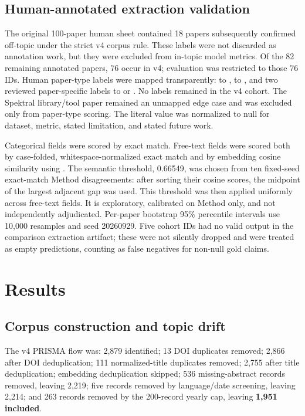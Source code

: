 \documentclass[sigconf,review,anonymous]{acmart}
\begin{document}
\subsection{Human-annotated extraction validation}
The original 100-paper human sheet contained 18 papers subsequently confirmed off-topic under the strict v4 corpus rule. These labels were not discarded as annotation work, but they were excluded from in-topic model metrics. Of the 82 remaining annotated papers, 76 occur in v4; evaluation was restricted to those 76 IDs. Human paper-type labels were mapped transparently: \texttt{} to \texttt{}, \texttt{} to \texttt{}, and two reviewed paper-specific labels to \texttt{} or \texttt{}. No \texttt{} labels remained in the v4 cohort. The Spektral library/tool paper remained an unmapped edge case and was excluded only from paper-type scoring. The literal value \texttt{} was normalized to null for dataset, metric, stated limitation, and stated future work.

Categorical fields were scored by exact match. Free-text fields were scored both by case-folded, whitespace-normalized exact match and by embedding cosine similarity using \texttt{}. The semantic threshold, 0.66549, was chosen from ten fixed-seed exact-match Method disagreements: after sorting their cosine scores, the midpoint of the largest adjacent gap was used. This threshold was then applied uniformly across free-text fields. It is exploratory, calibrated on Method only, and not independently adjudicated. Per-paper bootstrap 95\% percentile intervals use 10,000 resamples and seed 20260929. Five cohort IDs had no valid output in the comparison extraction artifact; these were not silently dropped and were treated as empty predictions, counting as false negatives for non-null gold claims.

\section{Results}
\subsection{Corpus construction and topic drift}
The v4 PRISMA flow was: 2,879 identified; 13 DOI duplicates removed; 2,866 after DOI deduplication; 111 normalized-title duplicates removed; 2,755 after title deduplication; embedding deduplication skipped; 536 missing-abstract records removed, leaving 2,219; five records removed by language/date screening, leaving 2,214; and 263 records removed by the 200-record yearly cap, leaving \textbf{1,951 included}.
\end{document}

